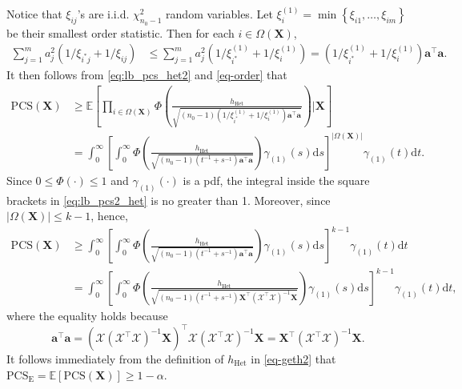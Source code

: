 \documentclass[ijoc,nonblindrev]{informs3}
\def\E{\mathbb{E}}
\def\ud{\mathrm{d}}
\def\bX{{\bm X}}
\def\cX{{\mathcal X}}
\def\PCS{\mathrm{PCS}}
\def\PCSE{\mathrm{PCS}_{\mathrm{E}}}
\def\hhet{h_{\mathrm{Het}}}
\begin{document}
Notice that $\xi_{ij}$'s are i.i.d. $\chi_{n_0-1}^2$ random variables. Let  $\xi_i^{(1)} = \min \left\{ \xi_{i1}, \ldots, \xi_{im}\right\}$ be their smallest  order statistic.
Then for each $i \in \Omega(\bX)$,
\begin{align}
\sum_{j=1}^m a_j^2 \left(1/\xi_{i^*j} + 1/\xi_{ij} \right) &\leq \sum_{j=1}^m a_j^2\left(1/\xi_{i^*}^{(1)} + 1/\xi_i^{(1)}\right) = \left(1/\xi_{i^*}^{(1)} + 1/\xi_i^{(1)}\right) \bm a^\intercal \bm a. \label{eq-order}
\end{align}
It then follows from \eqref{eq:lb_pcs_het2} and  \eqref{eq-order} that
\begin{align}
\mathrm{PCS}(\bX) &\geq \E \left[ \prod_{i\in\Omega(\bX)}  \Phi \left(\frac{\hhet} { \sqrt{ (n_0-1) (1/\xi_{i^*}^{(1)} + 1/\xi_i^{(1)} ) \bm a^\intercal \bm a} } \right) \Bigg| \bX \right] \nonumber \\
&= \int_0^\infty \left[ \int_0^\infty \Phi \left( \frac{\hhet}{\sqrt{ (n_0-1) (t^{-1}+s^{-1}) \bm a^\intercal \bm a }}  \right) \gamma_{(1)}(s) \ud s \right]^{|\Omega(\bX)|} \gamma_{(1)}(t) \ud t. \label{eq:lb_pcs2_het}
\end{align}
Since $0\leq \Phi(\cdot) \leq 1$ and $\gamma_{(1)}(\cdot)$ is a pdf, the integral inside the square brackets in \eqref{eq:lb_pcs2_het} is no greater than 1.
Moreover, since $|\Omega(\bX)|\leq k-1$, hence,
\begin{align*}
\mathrm{PCS}(\bX) &\geq \int_0^\infty \left[ \int_0^\infty \Phi \left( \frac{\hhet}{\sqrt{ (n_0-1) (t^{-1}+s^{-1}) \bm a^\intercal \bm a }}  \right) \gamma_{(1)}(s) \ud s \right]^{k-1} \gamma_{(1)}(t) \ud t \\
&= \int_0^\infty \left[ \int_0^\infty \Phi \left( \frac{\hhet}{\sqrt{ (n_0-1) (t^{-1}+s^{-1}) \bX^\intercal (\cX^\intercal \cX)^{-1} \bX }}  \right) \gamma_{(1)}(s) \ud s \right]^{k-1} \gamma_{(1)}(t) \ud t,
\end{align*}
where the equality holds because
\[\bm a^\intercal \bm a = (\cX (\cX^\intercal \cX)^{-1} \bX)^\intercal \cX (\cX^\intercal \cX)^{-1} \bX  = \bX^\intercal (\cX^\intercal \cX)^{-1} \bX. \]
It follows immediately from the definition of $\hhet$ in \eqref{eq-geth2} that $\PCSE=\E[\PCS(\bX)]\ge 1-\alpha$.
\Halmos
\endproof
\end{document}
